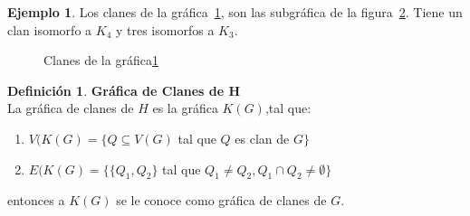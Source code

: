\documentclass[11pt]{book}
\theoremstyle{definition}
\newtheorem{definition}{Definición}
\newtheorem{example}{Ejemplo}
\newcounter{in}
\newcounter{ini}
\begin{document}
\begin{example}
  Los clanes de la gráfica~\ref{grafclan}, son las subgráfica de la
  figura~\ref{clanes}. Tiene un clan isomorfo a $K_4$ y tres isomorfos
  a $K_3$.






\begin{figure}
\centering
 \caption{} \label{grafclan}
\end{figure}






\begin{figure}
\centering
\caption{Clanes de la gráfica\ref{grafclan}}\label{clanes}
\end{figure}


\end{example}



\begin{definition}\textbf{Gráfica de Clanes de H}\\
La gráfica de clanes de $H$ es la gráfica $K(G)$,tal que: 
\begin{enumerate}
\item $V(K(G)=\{Q\subseteq V(G)$ tal que $Q$ es clan de $ G\}$ 
\item $E(K(G)=\{\{Q_1,Q_2\}$ tal que $Q_1 \ne Q_2,Q_1\cap Q_2 \ne\emptyset\} $ 
\end{enumerate}
entonces a $K(G)$ se le conoce como gráfica de clanes de $G$.
\end{definition}
\end{document}
